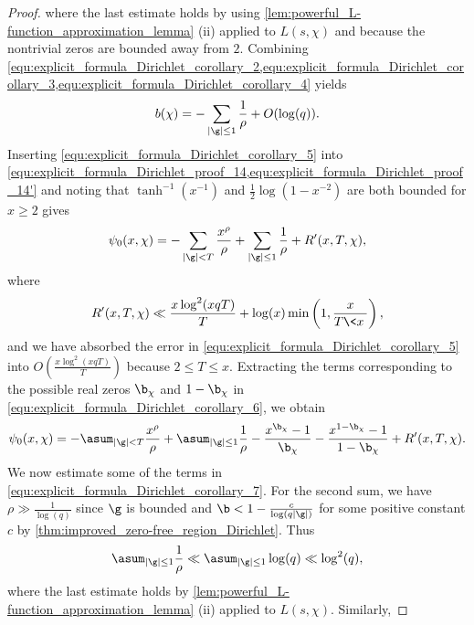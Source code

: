 \begin{proof}
      where the last estimate holds by using \cref{lem:powerful_L-function_approximation_lemma} (ii) applied to \(L(s,\chi)\) and because the nontrivial zeros are bounded away from \(2\). Combining \cref{equ:explicit_formula_Dirichlet_corollary_2,equ:explicit_formula_Dirichlet_corollary_3,equ:explicit_formula_Dirichlet_corollary_4} yields
      \begin{equation}\label{equ:explicit_formula_Dirichlet_corollary_5}
        b(\chi) = -\sum_{|\g| \le 1}\frac{1}{\rho}+O(\log(q)).
      \end{equation}
      Inserting \cref{equ:explicit_formula_Dirichlet_corollary_5} into \cref{equ:explicit_formula_Dirichlet_proof_14,equ:explicit_formula_Dirichlet_proof_14'} and noting that \(\tanh^{-1}(x^{-1})\) and \(\frac{1}{2}\log(1-x^{-2})\) are both bounded for \(x \ge 2\) gives
      \begin{equation}\label{equ:explicit_formula_Dirichlet_corollary_6}
        \psi_{0}(x,\chi) = -\sum_{|\g| < T}\frac{x^{\rho}}{\rho}+\sum_{|\g| \le 1}\frac{1}{\rho}+R'(x,T,\chi),
      \end{equation}
      where
      \[
        R'(x,T,\chi) \ll \frac{x\log^{2}(xqT)}{T}+\log(x)\min\left(1,\frac{x}{T\<x\>}\right),
      \]
      and we have absorbed the error in \cref{equ:explicit_formula_Dirichlet_corollary_5} into \(O\left(\frac{x\log^{2}(xqT)}{T}\right)\) because \(2 \le T \le x\). Extracting the terms corresponding to the possible real zeros \(\b_{\chi}\) and \(1-\b_{\chi}\) in \cref{equ:explicit_formula_Dirichlet_corollary_6}, we obtain
      \begin{equation}\label{equ:explicit_formula_Dirichlet_corollary_7}
        \psi_{0}(x,\chi) = -\asum_{|\g| < T}\frac{x^{\rho}}{\rho}+\asum_{|\g| \le 1}\frac{1}{\rho}-\frac{x^{\b_{\chi}}-1}{\b_{\chi}}-\frac{x^{1-\b_{\chi}}-1}{1-\b_{\chi}}+R'(x,T,\chi).
      \end{equation}
      We now estimate some of the terms in \cref{equ:explicit_formula_Dirichlet_corollary_7}. For the second sum, we have \(\rho \gg \frac{1}{\log(q)}\) since \(\g\) is bounded and \(\b < 1-\frac{c}{\log(q|\g|)}\) for some positive constant \(c\) by \cref{thm:improved_zero-free_region_Dirichlet}. Thus
      \begin{equation}\label{equ:explicit_formula_Dirichlet_corollary_8}
        \asum_{|\g| \le 1}\frac{1}{\rho} \ll \asum_{|\g| \le 1}\log(q) \ll \log^{2}(q),
      \end{equation}
      where the last estimate holds by \cref{lem:powerful_L-function_approximation_lemma} (ii) applied to \(L(s,\chi)\). Similarly,

\end{proof}
